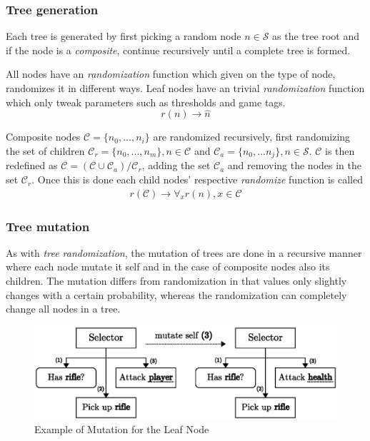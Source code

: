 \documentclass[a4paper, twocolumn]{article}
\begin{document}
        \subsubsection{Tree generation}

        Each tree is generated by first picking a random node \(n \in \mathcal{S}\) as the tree root and if the node is a \textit{composite}, continue recursively until a complete tree is formed.

        All nodes have an \textit{randomization} function which given on the type of node, randomizes it in different ways. Leaf nodes have an trivial \textit{randomization} function which only tweak parameters such as thresholds and game tags.
        \begin{equation*}
            r(n) \rightarrow \hat{n}
        \end{equation*}

        Composite nodes \(\mathcal{C} = \{n_0,...,n_i\}\) are randomized recursively, first randomizing the set of children \(\mathcal{C}_r = \{n_0,...,n_m\}, n \in \mathcal{C}\) and \(\mathcal{C}_a = \{n_0,...n_j\}, n \in \mathcal{S}\). \(\mathcal{C}\) is then redefined as \(\mathcal{C} = (\mathcal{C} \cup \mathcal{C}_a)/ \mathcal{C}_r \), adding the set \(\mathcal{C}_a\) and removing the nodes in the set \(\mathcal{C}_r\). Once this is done each child nodes' respective \textit{randomize} function is called 
        \begin{align*}
            r(\mathcal{C}) \rightarrow \forall_{x} r(n),x \in \mathcal{C}
        \end{align*}

        \subsubsection{Tree mutation}

        As with \textit{tree randomization}, the mutation of trees are done in a recursive manner where each node mutate it self and in the case of composite nodes also its children. The mutation differs from randomization in that values only slightly changes with a certain probability, whereas the randomization can completely change all nodes in a tree.
       
        \begin{figure}[H]
            \centering
            \includegraphics[width=\linewidth]{share/leaf_mutation.eps}
            \caption{Example of Mutation for the Leaf Node}
            \label{fig:leaf_mutation}
        \end{figure}
\end{document}
